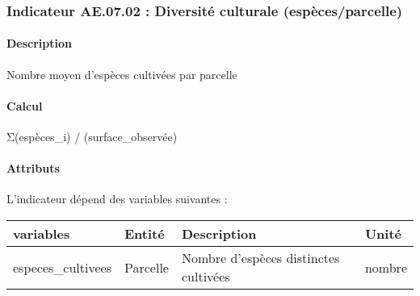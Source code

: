 \documentclass[
]{article}
\newenvironment{Shaded}{\begin{snugshade}}{\end{snugshade}}
\newcommand{\NormalTok}[1]{#1}
\begin{document}
\subsubsection{Indicateur AE.07.02 : Diversité culturale
(espèces/parcelle)}\label{indicateur-ae.07.02-diversituxe9-culturale-espuxe8cesparcelle}

\paragraph{Description}\label{description-15}

Nombre moyen d'espèces cultivées par parcelle

\paragraph{Calcul}\label{calcul-15}

\begin{Shaded}
\begin{Highlighting}[]
\NormalTok{Σ(espèces\_i) / (surface\_observée)}
\end{Highlighting}
\end{Shaded}

\paragraph{Attributs}\label{attributs-33}

L'indicateur dépend des variables suivantes :

\begin{longtable}[]{@{}
  >{\raggedright\arraybackslash}p{}
  >{\raggedright\arraybackslash}p{}
  >{\raggedright\arraybackslash}p{}
  >{\raggedright\arraybackslash}p{}@{}}
\toprule\noalign{}
\begin{minipage}[b]{\linewidth}\raggedright
\textbf{variables}
\end{minipage} & \begin{minipage}[b]{\linewidth}\raggedright
\textbf{Entité}
\end{minipage} & \begin{minipage}[b]{\linewidth}\raggedright
\textbf{Description}
\end{minipage} & \begin{minipage}[b]{\linewidth}\raggedright
\textbf{Unité}
\end{minipage} \\
\midrule\noalign{}
\endhead
\bottomrule\noalign{}
\endlastfoot
especes\_cultivees & Parcelle & Nombre d'espèces distinctes cultivées &
nombre \\
\end{longtable}
\end{document}
